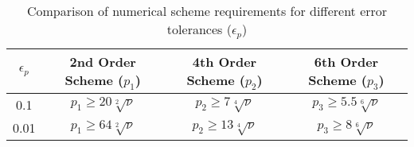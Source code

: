 \begin{table}[H]
    \centering
    \begin{tabular}{|c|c|c|c|}
        \hline
        $\epsilon_p$ & 2nd Order Scheme ($p_1$) & 4th Order Scheme ($p_2$) & 6th Order Scheme ($p_3$) \\
        \hline
        0.1 & $p_1 \geq 20\sqrt[2]{\nu}$ & $p_2 \geq 7\sqrt[4]{\nu}$ & $p_3 \geq 5.5\sqrt[6]{\nu}$ \\
		\hline
        0.01 & $p_1 \geq 64\sqrt[2]{\nu}$ & $p_2 \geq 13\sqrt[4]{\nu}$ & $p_3 \geq 8\sqrt[6]{\nu}$ \\
        \hline
    \end{tabular}
    \caption{Comparison of numerical scheme requirements for different error tolerances ($\epsilon_p$)}
    \label{tab:scheme_comparison}
\end{table}

